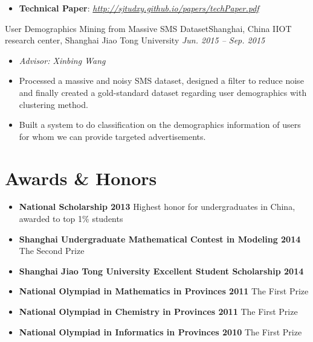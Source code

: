 \documentclass[letterpaper,12pt]{resume}
\begin{document}
\begin{itemize}
{\begin{itemize}
        \item{ \textbf{Technical Paper}: \textit{\footnotesize \url{http://sjtudxy.github.io/papers/techPaper.pdf}}}%
       
    \end{itemize}
    }
    
     \credential
    {User Demographics Mining from Massive SMS Dataset}{Shanghai, China}
    {IIOT research center, Shanghai Jiao Tong University}
    {\textit{Jun. 2015 -- Sep. 2015}}
    {
    \begin{itemize}
    \item{ \textit{Advisor: Xinbing Wang}}
      
	 \item{Processed a massive and noisy SMS dataset, designed a filter to reduce noise and finally created a gold-standard dataset regarding user demographics with clustering method.}
	 \item{Built a system to do classification on the demographics information of users for whom we can provide targeted advertisements. }
    \end{itemize}
    }


\end{itemize}  %

\pagebreak





\section{Awards \& Honors}
\begin{itemize}
\item {\bf National Scholarship 2013} {\footnotesize Highest honor for undergraduates in China, awarded to top 1\% students}

\item {\bf Shanghai Undergraduate Mathematical Contest in Modeling 2014} {\footnotesize The Second Prize}
    
   \item {\bf Shanghai Jiao Tong University Excellent Student Scholarship 2014}
   
    \item {\bf National Olympiad in Mathematics in Provinces 2011} {\footnotesize The First Prize }
    \item {\bf National Olympiad in Chemistry in Provinces 2011}
    {\footnotesize The First Prize}
  \item {\bf National Olympiad in Informatics in Provinces 2010}
 {\footnotesize The First Prize }
   


 \end{itemize}  %
\end{document}
